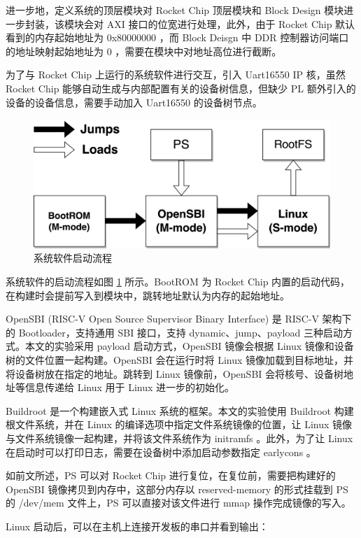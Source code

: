 进一步地，定义系统的顶层模块对 Rocket Chip 顶层模块和 Block Design 模块进一步封装，该模块会对 AXI 接口的位宽进行处理，此外，由于 Rocket Chip 默认看到的内存起始地址为 0x80000000 ，而 Block Deisgn 中 DDR 控制器访问端口的地址映射起始地址为 0 ，需要在模块中对地址高位进行截断。

为了与 Rocket Chip 上运行的系统软件进行交互，引入 Uart16550 IP 核，虽然 Rocket Chip 能够自动生成与内部配置有关的设备树信息，但缺少 PL 额外引入的设备的设备信息，需要手动加入 Uart16550 的设备树节点。

\begin{figure}
    \centering
    \includegraphics[width=0.8\linewidth]{figures/boot.png}
    \caption{系统软件启动流程}
    \label{fig:boot}
\end{figure}

系统软件的启动流程如图 \ref{fig:boot} 所示。BootROM 为 Rocket Chip 内置的启动代码，在构建时会提前写入到模块中，跳转地址默认为内存的起始地址。

OpenSBI (RISC-V Open Source Supervisor Binary Interface) 是 RISC-V 架构下的 Bootloader，支持通用 SBI 接口，支持 dynamic、jump、payload 三种启动方式。本文的实验采用 payload 启动方式，OpenSBI 镜像会根据 Linux 镜像和设备树的文件位置一起构建。OpenSBI 会在运行时将 Linux 镜像加载到目标地址，并将设备树放在指定的地址。跳转到 Linux 镜像前，OpenSBI 会将核号、设备树地址等信息传递给 Linux 用于 Linux 进一步的初始化。

Buildroot 是一个构建嵌入式 Linux 系统的框架。本文的实验使用 Buildroot 构建根文件系统，并在 Linux 的编译选项中指定文件系统镜像的位置，让 Linux 镜像与文件系统镜像一起构建，并将该文件系统作为 initramfs 。此外，为了让 Linux 在启动时可以打印日志，需要在设备树中添加启动参数指定 earlycons 。

如前文所述，PS 可以对 Rocket Chip 进行复位，在复位前，需要把构建好的 OpenSBI 镜像拷贝到内存中，这部分内存以 reserved-memory 的形式挂载到 PS 的 /dev/mem 文件上，PS 可以直接对该文件进行 mmap 操作完成镜像的写入。

Linux 启动后，可以在主机上连接开发板的串口并看到输出：

